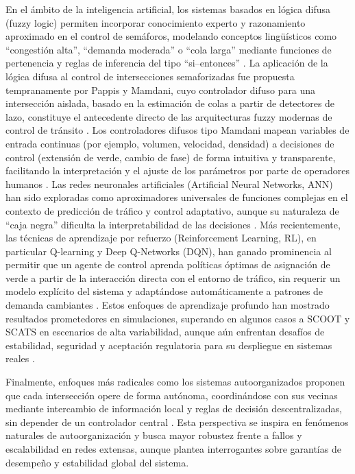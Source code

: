 En el ámbito de la inteligencia artificial, los sistemas basados en lógica difusa (fuzzy logic) permiten incorporar conocimiento experto y razonamiento aproximado en el control de semáforos, modelando conceptos lingüísticos como ``congestión alta'', ``demanda moderada'' o ``cola larga'' mediante funciones de pertenencia y reglas de inferencia del tipo ``si–entonces'' \cite{mamdani1975experiment,musriroh2020application}. La aplicación de la lógica difusa al control de intersecciones semaforizadas fue propuesta tempranamente por Pappis y Mamdani, cuyo controlador difuso para una intersección aislada, basado en la estimación de colas a partir de detectores de lazo, constituye el antecedente directo de las arquitecturas fuzzy modernas de control de tránsito \cite{pappis1977fuzzy}. Los controladores difusos tipo Mamdani mapean variables de entrada continuas (por ejemplo, volumen, velocidad, densidad) a decisiones de control (extensión de verde, cambio de fase) de forma intuitiva y transparente, facilitando la interpretación y el ajuste de los parámetros por parte de operadores humanos \cite{ross2010fuzzy,erdinc2023application}. Las redes neuronales artificiales (Artificial Neural Networks, ANN) han sido exploradas como aproximadores universales de funciones complejas en el contexto de predicción de tráfico y control adaptativo, aunque su naturaleza de ``caja negra'' dificulta la interpretabilidad de las decisiones \cite{papageorgiou2003review}. Más recientemente, las técnicas de aprendizaje por refuerzo (Reinforcement Learning, RL), en particular Q-learning y Deep Q-Networks (DQN), han ganado prominencia al permitir que un agente de control aprenda políticas óptimas de asignación de verde a partir de la interacción directa con el entorno de tráfico, sin requerir un modelo explícito del sistema y adaptándose automáticamente a patrones de demanda cambiantes \cite{abdulhai2003reinforcement,li2016realtime}. Estos enfoques de aprendizaje profundo han mostrado resultados prometedores en simulaciones, superando en algunos casos a SCOOT y SCATS en escenarios de alta variabilidad, aunque aún enfrentan desafíos de estabilidad, seguridad y aceptación regulatoria para su despliegue en sistemas reales \cite{li2016realtime}.

Finalmente, enfoques más radicales como los sistemas autoorganizados proponen que cada intersección opere de forma autónoma, coordinándose con sus vecinas mediante intercambio de información local y reglas de decisión descentralizadas, sin depender de un controlador central \cite{cools2013selflearning}. Esta perspectiva se inspira en fenómenos naturales de autoorganización y busca mayor robustez frente a fallos y escalabilidad en redes extensas, aunque plantea interrogantes sobre garantías de desempeño y estabilidad global del sistema.

